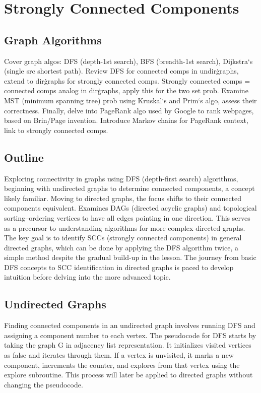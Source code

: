 \section*{Strongly Connected Components}

\subsection*{Graph Algorithms}
Cover graph algos: DFS (depth-1st search), BFS (breadth-1st search), Dijkstra`s (single src shortest path).
Review DFS for connected comps in undir\. graphs, extend to dir\. graphs for strongly connected comps.
Strongly connected comps = connected comps analog in dir\. graphs, apply this for the two set prob.
Examine MST (minimum spanning tree) prob using Kruskal`s and Prim`s algo, assess their correctness.
Finally, delve into PageRank algo used by Google to rank webpages, based on Brin/Page invention.
Introduce Markov chains for PageRank context, link to strongly connected comps.

\subsection*{Outline}
Exploring connectivity in graphs using DFS (depth-first search) algorithms, beginning with undirected graphs to determine connected components, a concept likely familiar.
Moving to directed graphs, the focus shifts to their connected components equivalent.
Examines DAGs (directed acyclic graphs) and topological sorting--ordering vertices to have all edges pointing in one direction.
This serves as a precursor to understanding algorithms for more complex directed graphs.
The key goal is to identify SCCs (strongly connected components) in general directed graphs, which can be done by applying the DFS algorithm twice, a simple method despite the gradual build-up in the lesson.
The journey from basic DFS concepts to SCC identification in directed graphs is paced to develop intuition before delving into the more advanced topic.

\subsection*{Undirected Graphs}
Finding connected components in an undirected graph involves running DFS and assigning a component number to each vertex.
The pseudocode for DFS starts by taking the graph G in adjacency list representation.
It initializes visited vertices as false and iterates through them.
If a vertex is unvisited, it marks a new component, increments the counter, and explores from that vertex using the explore subroutine.
This process will later be applied to directed graphs without changing the pseudocode.


